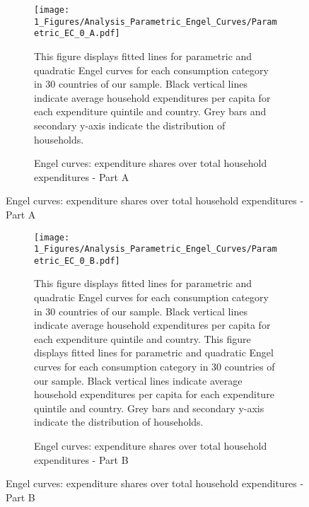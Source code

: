 \begin{figure}[ht!]
  \centering
  \caption{Engel curves: expenditure shares over total household expenditures} \label{fig:Engel}
  \begin{subfigure}[b]{\textwidth}
  \centering
  \texttt{[image: 1\_Figures/Analysis\_Parametric\_Engel\_Curves/Parametric\_EC\_0\_A.pdf]}
  \caption{Engel curves: expenditure shares over total household expenditures - Part A} \label{fig:Engel_1}
  \begin{subcaption2}
    This figure displays fitted lines for parametric and quadratic Engel curves for each consumption category in 30 countries of our sample. Black vertical lines indicate average household expenditures per capita for each expenditure quintile and country. Grey bars and secondary y-axis indicate the distribution of households.
  \end{subcaption2}
  \end{subfigure}
\end{figure}

\clearpage

\begin{figure}[ht!]\ContinuedFloat
   \begin{subfigure}[b]{\textwidth}
  \centering
  \texttt{[image: 1\_Figures/Analysis\_Parametric\_Engel\_Curves/Parametric\_EC\_0\_B.pdf]}
  \caption{Engel curves: expenditure shares over total household expenditures - Part B} \label{fig:Engel_2}
  \begin{subcaption2}
    This figure displays fitted lines for parametric and quadratic Engel curves for each consumption category in 30 countries of our sample. Black vertical lines indicate average household expenditures per capita for each expenditure quintile and country. This figure displays fitted lines for parametric and quadratic Engel curves for each consumption category in 30 countries of our sample. Black vertical lines indicate average household expenditures per capita for each expenditure quintile and country. Grey bars and secondary y-axis indicate the distribution of households.
  \end{subcaption2}
\end{subfigure}
\end{figure}

\clearpage

